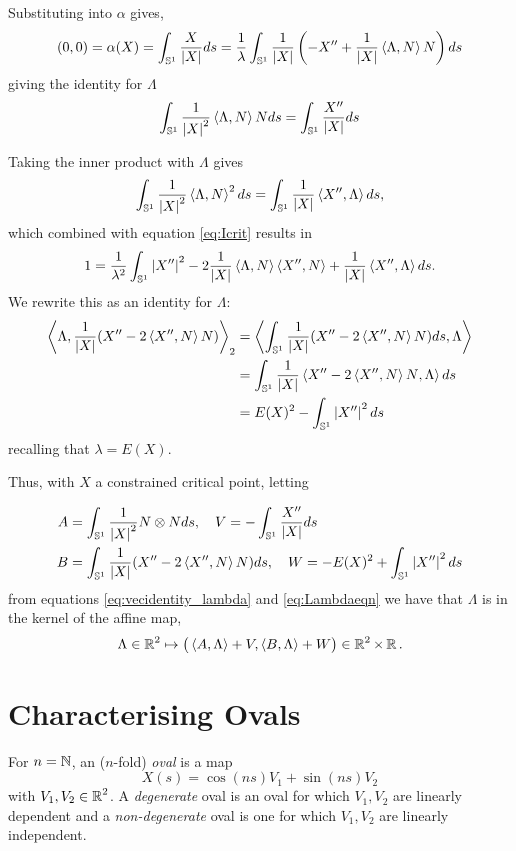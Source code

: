 \documentclass[12pt]{article}
\begin{document}
Substituting into \(\alpha\) gives,
\[
(0, 0) = \alpha(X) = \int_{\operatorname{\mathbb{S}^1}} \frac{X}{\left|{X}\right|} ds = \frac{1}{\lambda} \int_{\operatorname{\mathbb{S}^1}} \frac{1}{\left|{X}\right|} \left(-X'' + \frac{1}{\left|{X}\right|} \left\langle{\Lambda},{N}\right\rangle N\right) ds
\]
giving the identity for \(\Lambda\)
\begin{equation}
\label{eq:vecidentity_lambda}
\int_{\operatorname{\mathbb{S}^1}} \frac{1}{\left|{X}\right|^2} \left\langle{\Lambda},{N}\right\rangle N ds = \int_{\operatorname{\mathbb{S}^1}} \frac{X''}{\left|{X}\right|} ds
\end{equation}

Taking the inner product with \(\Lambda\) gives
\[
\int_{\operatorname{\mathbb{S}^1}} \frac{1}{\left|{X}\right|^2} \left\langle{\Lambda},{N}\right\rangle^2 ds = \int_{\operatorname{\mathbb{S}^1}} \frac{1}{\left|{X}\right|} \left\langle{X''},{\Lambda}\right\rangle ds,
\]
which combined with equation \eqref{eq:Icrit} results in
\[
1 = \frac{1}{\lambda^2} \int_{\operatorname{\mathbb{S}^1}} \left|{X''}\right|^2 - 2\frac{1}{\left|{X}\right|} \left\langle{\Lambda},{N}\right\rangle\left\langle{X''},{N}\right\rangle +  \frac{1}{\left|{X}\right|} \left\langle{X''},{\Lambda}\right\rangle ds.
\]
We rewrite this as an identity for \(\Lambda\):
\begin{equation}
\label{eq:Lambdaeqn}
\begin{split}
\left\langle{\Lambda},{\frac{1}{\left|{X}\right|} (X'' - 2 \left\langle{X''},{N}\right\rangle N)}\right\rangle_2 &= \left\langle{\int_{\operatorname{\mathbb{S}^1}} \frac{1}{\left|{X}\right|} (X'' - 2 \ensuremath{\left\langle{X''},{N}\right\rangle}N) ds},{\Lambda}\right\rangle \\
&= \int_{\operatorname{\mathbb{S}^1}} \frac{1}{\left|{X}\right|} \left\langle{X'' - 2 \ensuremath{\left\langle{X''},{N}\right\rangle}N},{\Lambda}\right\rangle ds \\
&= E(X)^2 - \int_{\operatorname{\mathbb{S}^1}} \left|{X''}\right|^2 ds
\end{split}
\end{equation}
recalling that \(\lambda = E(X)\).

Thus, with \(X\) a constrained critical point, letting

\begin{align*}
A &= \int_{\operatorname{\mathbb{S}^1}} \frac{1}{\left|{X}\right|^2} N \otimes N ds, \quad V = -\int_{\operatorname{\mathbb{S}^1}} \frac{X''}{\left|{X}\right|} ds \\
B &= \int_{\operatorname{\mathbb{S}^1}} \frac{1}{\left|{X}\right|} (X'' - 2 \left\langle{X''},{N}\right\rangle N) ds, \quad W = -E(X)^2 + \int_{\operatorname{\mathbb{S}^1}} \left|{X''}\right|^2 ds
\end{align*}
from equations \eqref{eq:vecidentity_lambda} and \eqref{eq:Lambdaeqn} we have that \(\Lambda\) is in the kernel of the affine map,
\[
\Lambda \in \operatorname{\mathbb{R}}^2 \mapsto \big(\left\langle{A},{\Lambda}\right\rangle + V, \left\langle{B},{\Lambda}\right\rangle + W\big) \in \operatorname{\mathbb{R}}^2 \times \operatorname{\mathbb{R}}.
\]

\section{Characterising Ovals}
\label{sec:ovals}

\begin{defn}
For \(n = \operatorname{\mathbb{N}}\), an (\(n\)-fold) \emph{oval} is a map
\[
X(s) = \cos(n s) V_1 + \sin(n s) V_2
\]
with \(V_1, V_2 \in \operatorname{\mathbb{R}}^2\). A \emph{degenerate} oval is an oval for which \(V_1, V_2\) are linearly dependent and a \emph{non-degenerate} oval is one for which \(V_1, V_2\) are linearly independent.
\end{defn}
\end{document}
